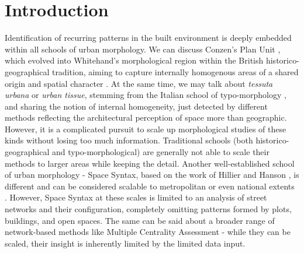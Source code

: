 \section{Introduction}
\label{sec:intro}

Identification of recurring patterns in the built environment is deeply embedded within
all schools of urban morphology. We can discuss Conzen's Plan Unit \citep{conzen1960},
which evolved into Whitehand's morphological region within the British
historico-geographical tradition, aiming to capture internally homogenous areas of a
shared origin and spatial character \citep{oliveira2020}. At the same time, we may talk
about \textit{tessuta urbana} or \textit{urban tissue}, stemming from the Italian school
of typo-morphology \citep{caniggia2001}, and sharing the notion of internal homogeneity,
just detected by different methods reflecting the architectural perception of space more
than geographic. However, it is a complicated pursuit to scale up morphological studies
of these kinds without losing too much information. Traditional schools (both
historico-geographical and typo-morphological) are generally not able to scale their
methods to larger areas while keeping the detail. Another well-established school of
urban morphology - Space Syntax, based on the work of Hillier and Hanson
\citep{hillier1996}, is different and can be considered scalable to metropolitan or even
national extents \citep{spacesyntaxlimited2018}. However, Space Syntax at these scales
is limited to an analysis of street networks and their configuration, completely
omitting patterns formed by plots, buildings, and open spaces. The same can be said
about a broader range of network-based methods like Multiple Centrality Assessment
\citep{porta2010} - while they can be scaled, their insight is inherently limited by the
limited data input.

